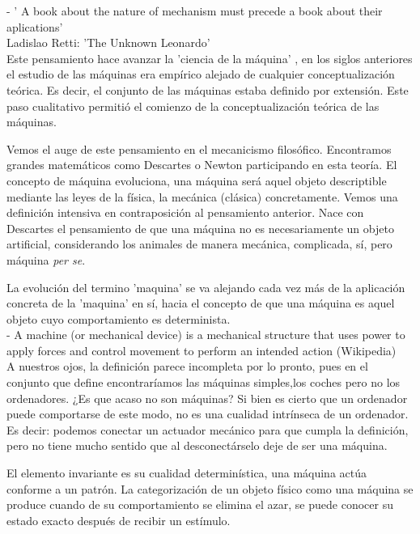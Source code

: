 - ' A book about the nature of mechanism must precede a book about their aplications' \\

Ladislao Retti: 'The Unknown Leonardo' \\

Este pensamiento hace avanzar la 'ciencia de la máquina' , en los siglos anteriores el estudio de las máquinas era empírico alejado de cualquier conceptualización teórica. Es decir, el conjunto de las máquinas estaba definido por extensión. Este paso cualitativo permitió el comienzo de la conceptualización teórica de las máquinas.

\vspace{10px}

Vemos el auge de este pensamiento en el mecanicismo filosófico. Encontramos grandes matemáticos como Descartes o Newton participando en esta teoría. El concepto de máquina evoluciona, una máquina será aquel objeto descriptible mediante las leyes de la física, la mecánica (clásica) concretamente. Vemos una definición intensiva en contraposición al pensamiento anterior. Nace con Descartes el pensamiento de que una máquina no es necesariamente un objeto artificial, considerando los animales de manera mecánica, complicada, sí, pero máquina \textit{per se}. 

\newpage

La evolución del termino 'maquina' se va alejando cada vez más de la aplicación concreta de la 'maquina' en sí, hacia el concepto de que una máquina es aquel objeto cuyo comportamiento es determinista. \\

- A machine (or mechanical device) is a mechanical structure that uses power to apply forces and control movement to perform an intended action (Wikipedia) \\

A nuestros ojos, la definición parece incompleta por lo pronto, pues en el conjunto que define encontraríamos las máquinas simples,los coches pero no los ordenadores. ¿Es que acaso no son máquinas? Si bien es cierto que un ordenador puede comportarse de este modo, no es una cualidad intrínseca de un ordenador. Es decir: podemos conectar un actuador mecánico para que cumpla la definición, pero no tiene mucho sentido que al desconectárselo deje de ser una máquina. 

\vspace{10px}

El elemento invariante es su cualidad determinística, una máquina actúa conforme a un patrón. La categorización de un objeto físico como una máquina se produce cuando de su comportamiento se elimina el azar, se puede conocer su estado exacto después de recibir un estímulo.



